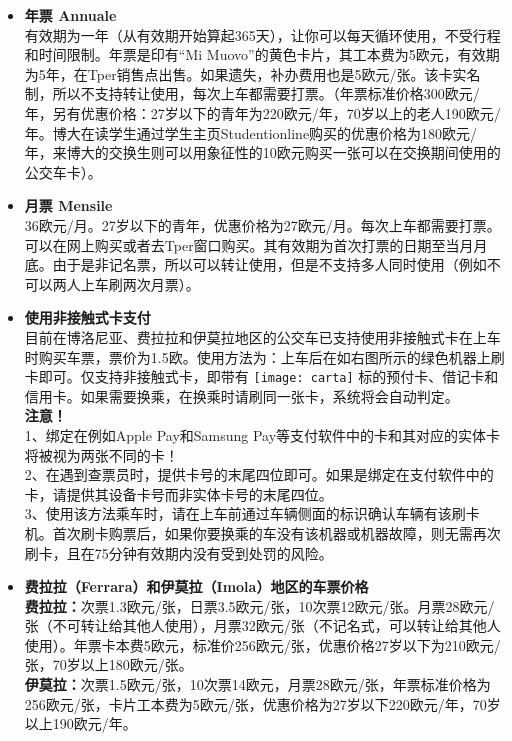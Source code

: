 \begin{itemize}
\item  \textbf{年票 Annuale}\\
有效期为一年（从有效期开始算起365天），让你可以每天循环使用，不受行程和时间限制。年票是印有“Mi Muovo”的黄色卡片，其工本费为5欧元，有效期为5年，在Tper销售点出售。如果遗失，补办费用也是5欧元/张。该卡实名制，所以不支持转让使用，每次上车都需要打票。（年票标准价格300欧元/年，另有优惠价格：27岁以下的青年为220欧元/年，70岁以上的老人190欧元/年。博大在读学生通过学生主页Studentionline购买的优惠价格为180欧元/年，来博大的交换生则可以用象征性的10欧元购买一张可以在交换期间使用的公交车卡）。
\item  \textbf{月票 Mensile}\\
36欧元/月。27岁以下的青年，优惠价格为27欧元/月。每次上车都需要打票。可以在网上购买或者去Tper窗口购买。其有效期为首次打票的日期至当月月底。由于是非记名票，所以可以转让使用，但是不支持多人同时使用（例如不可以两人上车刷两次月票）。
\item  \textbf{使用非接触式卡支付}\\
目前在博洛尼亚、费拉拉和伊莫拉地区的公交车已支持使用非接触式卡在上车时购买车票，票价为1.5欧。使用方法为：上车后在如右图所示的绿色机器上刷卡即可。仅支持非接触式卡，即带有 \texttt{[image: carta]} 标的预付卡、借记卡和信用卡。如果需要换乘，在换乘时请刷同一张卡，系统将会自动判定。\\
\textbf{注意！}\\
1、绑定在例如Apple Pay和Samsung Pay等支付软件中的卡和其对应的实体卡将被视为两张不同的卡！\\
2、在遇到查票员时，提供卡号的末尾四位即可。如果是绑定在支付软件中的卡，请提供其设备卡号而非实体卡号的末尾四位。\\
3、使用该方法乘车时，请在上车前通过车辆侧面的标识确认车辆有该刷卡机。首次刷卡购票后，如果你要换乘的车没有该机器或机器故障，则无需再次刷卡，且在75分钟有效期内没有受到处罚的风险。
\item  \textbf{费拉拉（Ferrara）和伊莫拉（Imola）地区的车票价格}\\
\textbf{费拉拉：}次票1.3欧元/张，日票3.5欧元/张，10次票12欧元/张。月票28欧元/张（不可转让给其他人使用），月票32欧元/张（不记名式，可以转让给其他人使用）。年票卡本费5欧元，标准价256欧元/张，优惠价格27岁以下为210欧元/张，70岁以上180欧元/张。\\
\textbf{伊莫拉：}次票1.5欧元/张，10次票14欧元，月票28欧元/张，年票标准价格为256欧元/张，卡片工本费为5欧元/张，优惠价格为27岁以下220欧元/年，70岁以上190欧元/年。



\end{itemize}

